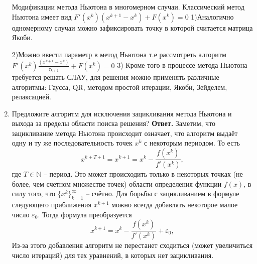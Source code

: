 \documentclass{article}
\begin{document}
\begin{enumerate}
	
	Модификации метода Ньютона в многомерном случаи.
	Классический метод Ньютона имеет вид $F'(x^k)(x^{k+1}-x^k)+F(x^k)=0$
	1)Аналогично одномерному случаи можно зафиксировать точку в которой считается матрица Якоби.
	
	2)Можно ввести параметр в метод Ньютона т.е рассмотреть алгоритм $F'(x^k)\frac{(x^{k+1}-x^k)}{\tau_{k+1}}+F(x^k)=0$
	3) Кроме того в процессе метода Ньютона требуется решать СЛАУ, для решения можно применять различные алгоритмы: Гаусса, QR, методом простой итерации, Якоби, Зейделем, релаксацией.
        \item Предложите алгоритм для исключения зацикливания метода Ньютона и выхода за пределы области поиска решения?
        \newline 
        {\bfseries Ответ. } 
        Заметим, что зацикливание метода Ньютона происходит означает, что алгоритм выдаёт одну и ту же 
        последовательность точек $x^k$ с некоторым периодом. То есть 
        \begin{equation*}
            x^{k+T+1} = x^{k+1} = x^k - \frac{f(x^k)}{f'(x^k)},
        \end{equation*}
        где $T \in \mathbb{N}$ -- период. Это может происходить только в некоторых точках (не более, чем счетном множестве точек) области 
        определения функции $f(x)$, в силу того, что $\{x^k\}_{k=1}^\infty$ -- счётно. 
        Для борьбы с зацикливанием в формуле следующего приближения $x^{k+1}$ можно всегда добавлять 
        некоторое малое число $\varepsilon_0$.
        Тогда формула преобразуется 
        \begin{equation*}
            x^{k+1} = x^k - \frac{f(x^k)}{f'(x^k)} +\varepsilon_0 ,
        \end{equation*}
        Из-за этого добавления алгоритм не перестанет сходиться (может увеличиться число итераций) для тех уравнений, в которых нет зацикливания.


\end{enumerate}
\end{document}
